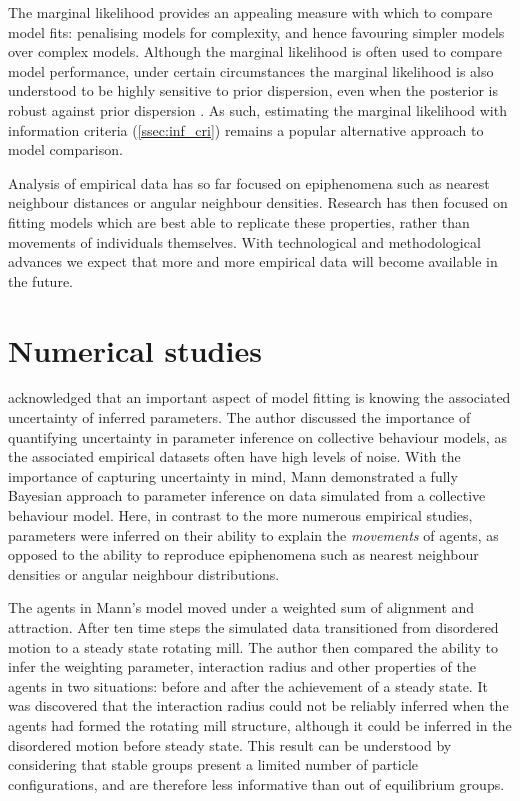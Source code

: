 The marginal likelihood provides an appealing measure with which to compare
model fits: penalising models for complexity, and hence favouring simpler
models over complex models. Although the marginal likelihood is often used to
compare model performance, under certain circumstances the marginal likelihood
is also understood to be highly sensitive to prior dispersion, even when the
posterior is robust against prior dispersion \parencite{fong20}. As such,
estimating the marginal likelihood with information criteria
(\cref{ssec:inf_cri}) remains a popular alternative approach to model comparison.

Analysis of empirical data has so far focused on epiphenomena such as nearest
neighbour distances or angular neighbour densities. Research has then focused
on fitting models which are best able to replicate these properties, rather
than movements of individuals themselves. With technological and methodological
advances we expect that more and more empirical data will become available in
the future.

\section{Numerical studies}
\label{sec:numerical_studies}

\textcite{mann11} acknowledged that an important aspect of model fitting is
knowing the associated uncertainty of inferred parameters. The author discussed
the importance of quantifying uncertainty in parameter inference on collective
behaviour models, as the associated empirical datasets often have high levels
of noise. With the importance of capturing uncertainty in mind, Mann
demonstrated a fully Bayesian approach to parameter inference on data simulated
from a collective behaviour model. Here, in contrast to the more numerous
empirical studies, parameters were inferred on their ability to explain the
\emph{movements} of agents, as opposed to the ability to reproduce epiphenomena
such as nearest neighbour densities or angular neighbour distributions.

The agents in Mann's model moved under a weighted sum of alignment and
attraction. After ten time steps the simulated data transitioned from
disordered motion to a steady state rotating mill. The author then compared the
ability to infer the weighting parameter, interaction radius and other
properties of the agents in two situations: before and after the achievement of
a steady state. It was discovered that the interaction radius could not be
reliably inferred when the agents had formed the rotating mill structure,
although it could be inferred in the disordered motion before steady state.
This result can be understood by considering that stable groups present a
limited number of particle configurations, and are therefore less informative
than out of equilibrium groups.

